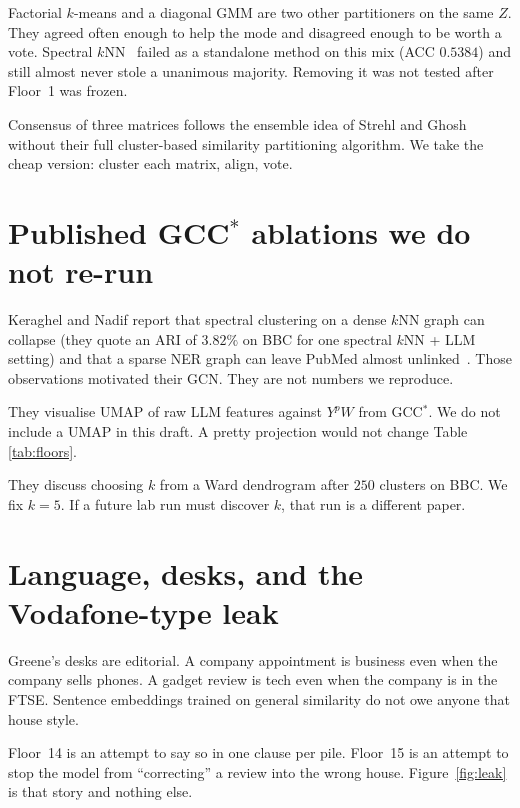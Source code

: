 \documentclass[11pt,a4paper]{article}
\begin{document}
Factorial $k$-means and a diagonal GMM are two other
partitioners on the same $Z$. They agreed often enough to
help the mode and disagreed enough to be worth a vote.
Spectral $k$NN~\cite{vonluxburg2007tutorial} failed as a
standalone method on this mix (ACC $0.5384$) and still
almost never stole a unanimous majority. Removing it was
not tested after Floor~1 was frozen.

Consensus of three matrices follows the ensemble idea of
Strehl and Ghosh~\cite{strehl2002cluster} without their full
cluster-based similarity partitioning algorithm. We take
the cheap version: cluster each matrix, align, vote.

\section{Published GCC$^*$ ablations we do not re-run}

Keraghel and Nadif report that spectral clustering on a dense
$k$NN graph can collapse (they quote an ARI of $3.82\%$ on
BBC for one spectral $k$NN + LLM setting) and that a sparse
NER graph can leave PubMed almost unlinked~\cite{keraghel2024gcc}.
Those observations motivated their GCN. They are not
numbers we reproduce.

They visualise UMAP of raw LLM features against
$Y^p W$ from GCC$^*$. We do not include a UMAP in this
draft. A pretty projection would not change Table
\ref{tab:floors}.

They discuss choosing $k$ from a Ward dendrogram after
$250$ clusters on BBC. We fix $k=5$. If a future lab run
must discover $k$, that run is a different paper.

\section{Language, desks, and the Vodafone-type leak}

Greene's desks are editorial. A company appointment is
business even when the company sells phones. A gadget review
is tech even when the company is in the FTSE. Sentence
embeddings trained on general similarity do not owe anyone
that house style.

Floor~14 is an attempt to say so in one clause per pile.
Floor~15 is an attempt to stop the model from ``correcting''
a review into the wrong house. Figure~\ref{fig:leak} is that
story and nothing else.
\end{document}
